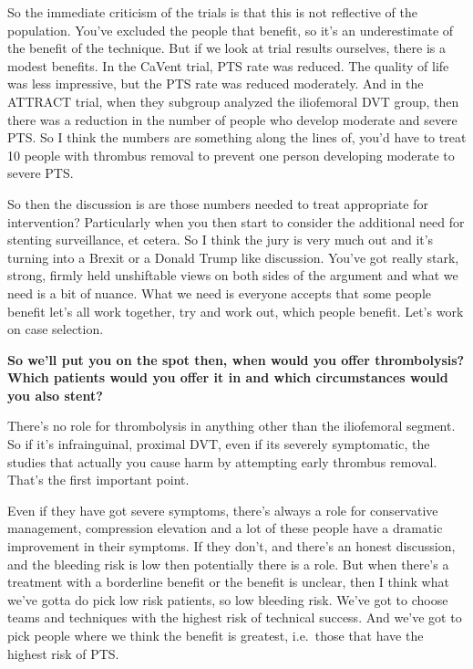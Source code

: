 \documentclass[
]{book}
\begin{document}
So the immediate criticism of the trials is that this is not reflective
of the population. You've excluded the people that benefit, so it's an
underestimate of the benefit of the technique. But if we look at trial
results ourselves, there is a modest benefits. In the CaVent trial, PTS
rate was reduced. The quality of life was less impressive, but the PTS
rate was reduced moderately.\citep{haig2016} And in the ATTRACT trial, when
they subgroup analyzed the iliofemoral DVT group, then there was a
reduction in the number of people who develop moderate and severe PTS.
So I think the numbers are something along the lines of, you'd have to
treat 10 people with thrombus removal to prevent one person developing
moderate to severe PTS.\citep{vedantham2017}

So then the discussion is are those numbers needed to treat appropriate
for intervention? Particularly when you then start to consider the
additional need for stenting surveillance, et cetera. So I think the
jury is very much out and it's turning into a Brexit or a Donald Trump
like discussion. You've got really stark, strong, firmly held
unshiftable views on both sides of the argument and what we need is a
bit of nuance. What we need is everyone accepts that some people benefit
let's all work together, try and work out, which people benefit. Let's
work on case selection.

\textbf{So we'll put you on the spot then, when would you offer thrombolysis?
Which patients would you offer it in and which circumstances would you
also stent?}

There's no role for thrombolysis in anything other than the iliofemoral
segment. So if it's infrainguinal, proximal DVT, even if its severely
symptomatic, the studies that actually you cause harm by attempting
early thrombus removal. That's the first important point.

Even if they have got severe symptoms, there's always a role for
conservative management, compression elevation and a lot of these people
have a dramatic improvement in their symptoms. If they don't, and
there's an honest discussion, and the bleeding risk is low then
potentially there is a role. But when there's a treatment with a
borderline benefit or the benefit is unclear, then I think what we've
gotta do pick low risk patients, so low bleeding risk. We've got to
choose teams and techniques with the highest risk of technical success.
And we've got to pick people where we think the benefit is greatest,
i.e.~those that have the highest risk of PTS.
\end{document}
